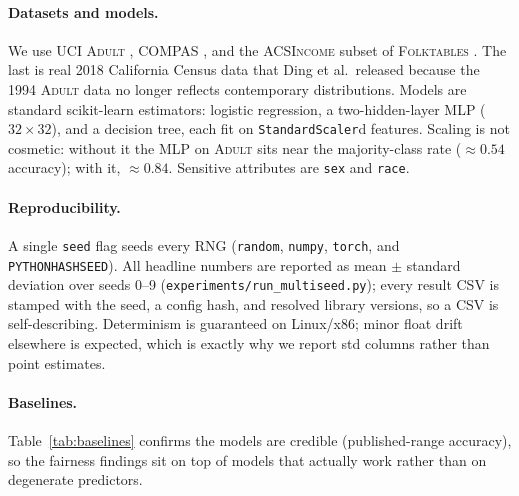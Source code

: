 \documentclass[11pt]{article}
\newcommand{\dataset}[1]{\textsc{#1}}
\begin{document}
\paragraph{Datasets and models.} We use \dataset{UCI Adult}
\cite{kohavi1996adult}, \dataset{COMPAS} \cite{angwin2016machinebias}, and the
\dataset{ACSIncome} subset of \dataset{Folktables} \cite{ding2021retiring}. The
last is real 2018 California Census data that Ding et al.\ released because the
1994 \dataset{Adult} data no longer reflects contemporary distributions.
Models are standard scikit-learn estimators: logistic regression,
a two-hidden-layer MLP ($32\times32$), and a decision tree, each fit on
\texttt{StandardScaler}d features. Scaling is not cosmetic: without it the MLP on
\dataset{Adult} sits near the majority-class rate ($\approx\!0.54$ accuracy);
with it, $\approx\!0.84$. Sensitive attributes are \texttt{sex} and
\texttt{race}.

\paragraph{Reproducibility.} A single \texttt{seed} flag seeds every RNG
(\texttt{random}, \texttt{numpy}, \texttt{torch}, and \texttt{PYTHONHASHSEED}).
All headline numbers are reported as mean $\pm$ standard deviation over seeds
0--9 (\texttt{experiments/run\_multiseed.py}); every result CSV is stamped with
the seed, a config hash, and resolved library versions, so a CSV is
self-describing. Determinism is guaranteed on Linux/x86; minor float drift
elsewhere is expected, which is exactly why we report std columns rather than
point estimates.

\paragraph{Baselines.} Table~\ref{tab:baselines} confirms the models are credible
(published-range accuracy), so the fairness findings sit on top of models that
actually work rather than on degenerate predictors.
\end{document}
